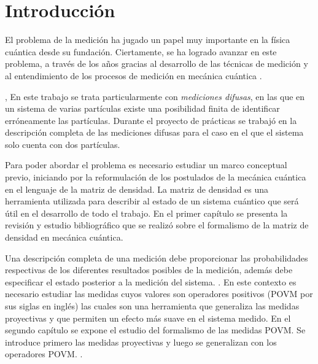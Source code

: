 \chapter*{Introducción}

El problema de la medición ha jugado un papel muy importante en la física
cuántica desde su fundación. Ciertamente, se ha logrado avanzar en este
problema, a través de los años gracias al desarrollo de las técnicas de
medición y al entendimiento de los procesos de medición en mecánica cuántica
{\cite{Pineda_2021}}. 

 , 
En este trabajo se trata particularmente con \textit{mediciones difusas}, en las
que en un sistema de varias partículas existe una posibilidad finita de
identificar erróneamente las partículas. Durante el proyecto de prácticas se
trabajó en la descripción completa de las mediciones difusas para el caso en el
que el sistema solo cuenta con dos partículas.

Para poder abordar el problema es necesario estudiar un marco conceptual previo, iniciando por la reformulación de los postulados de la mecánica cuántica en el lenguaje de la matriz de densidad. La matriz de densidad es una herramienta utilizada para describir al estado de un sistema cuántico que será útil en el desarrollo de todo el trabajo. En el primer capítulo  se presenta la revisión y estudio bibliográfico que se realizó sobre el formalismo de la matriz de densidad en mecánica cuántica. 

Una descripción completa de una medición debe proporcionar las probabilidades
respectivas de los diferentes resultados posibles de la medición, además debe  especificar el estado posterior a la medición del sistema. 
 . 
En este contexto es necesario estudiar las medidas cuyos valores son operadores positivos (POVM por sus siglas en inglés) las cuales son una herramienta que generaliza las medidas proyectivas y que permiten un efecto más suave en el sistema medido. En el segundo capítulo se expone el estudio del formalismo de las medidas POVM\@. Se introduce primero las medidas proyectivas y luego se generalizan con los operadores POVM\@. 
.


